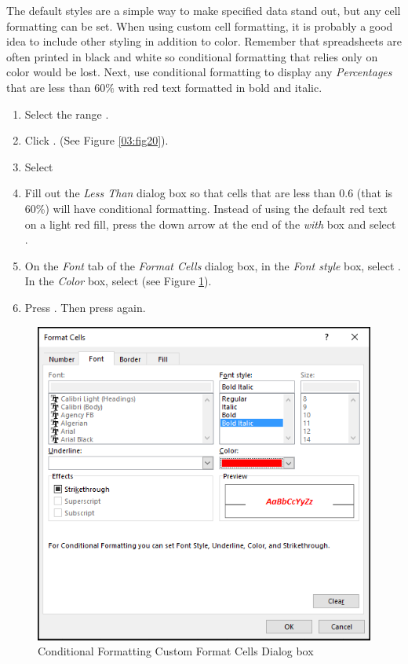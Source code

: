 The default styles are a simple way to make specified data stand out, but any cell formatting can be set. When using custom cell formatting, it is probably a good idea to include other styling in addition to color. Remember that spreadsheets are often printed in black and white so conditional formatting that relies only on color would be lost. Next, use conditional formatting to display any \textit{Percentages} that are less than $ 60\% $ with red text formatted in bold and italic.

\begin{enumerate}
	\item Select the range .
	\item Click . (See Figure \ref{03:fig20}).
	\item Select 
	\item Fill out the \textit{Less Than} dialog box so that cells that are less than $ 0.6 $ (that is 60\%) will have conditional formatting. Instead of using the default red text on a light red fill, press the down arrow at the end of the \textit{with} box and select .
	\item On the \textit{Font} tab of the \textit{Format Cells} dialog box, in the \textit{Font style} box, select . In the \textit{Color} box, select  (see Figure \ref{03:fig22}).
	\item Press . Then press  again.
\end{enumerate}

\begin{figure}[H]
	\centering
	\includegraphics[width=\maxwidth{.95\linewidth}]{gfx/ch03_fig22}
	\caption{Conditional Formatting Custom Format Cells Dialog box}
	\label{03:fig22}
\end{figure}

